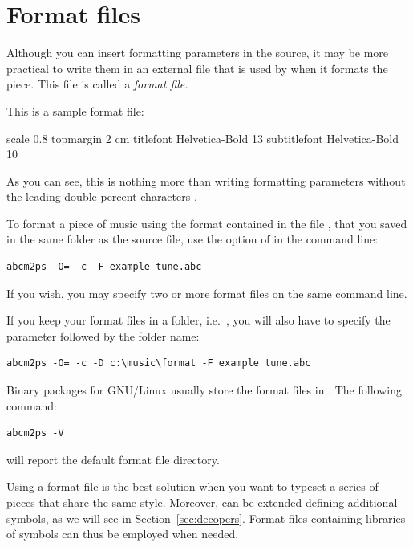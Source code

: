 \documentclass[a4paper,12pt]{book}
\begin{document}



\section{Format files}
\label{sec:formatfiles}

Although you can insert formatting parameters in the source, it may be
more practical to write them in an external file that is used by
\abcm{} when it formats the piece. This file is called a \emph{format
file.}

This is a sample format file:

\begin{abcsource}

scale 0.8
topmargin 2 cm
titlefont Helvetica-Bold 13
subtitlefont Helvetica-Bold 10
\end{abcsource}

As you can see, this is nothing more than writing formatting
parameters without the leading double percent characters \car{\%\%}.

To format a piece of music using the format contained in the file
, that you saved in the same folder as the source
file, use the option  of \abcm{} in the command line:

\begin{verbatim}
abcm2ps -O= -c -F example tune.abc
\end{verbatim}

If you wish, you may specify two or more format files on the same
command line.

If you keep your format files in a folder, i.e.\ 
, you will also have to specify the
\file{-D} parameter followed by the folder name:

\begin{verbatim}
abcm2ps -O= -c -D c:\music\format -F example tune.abc
\end{verbatim}

Binary packages for GNU/Linux usually store the format files in
. The following command:

\begin{verbatim}
abcm2ps -V
\end{verbatim}

will report the default format file directory.

Using a format file is the best solution when you want to typeset a
series of pieces that share the same style. Moreover, \abcm{} can be
extended defining additional symbols, as we will see in
Section~\ref{sec:decopers}. Format files containing libraries of
symbols can thus be employed when needed.
\end{document}
